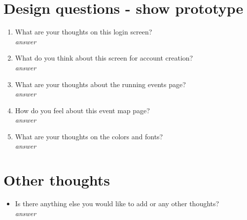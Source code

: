 \documentclass{article}
\begin{document}
\section*{Design questions - show prototype}
\begin{enumerate}[label=\textbf{Question \arabic*:}]
    \item What are your thoughts on this login screen?\\
        \textit{answer}
    \item What do you think about this screen for account creation?\\
        \textit{answer}
    \item What are your thoughts about the running events page?\\
        \textit{answer}
    \item How do you feel about this event map page?\\
        \textit{answer}
    \item What are your thoughts on the colors and fonts?\\
        \textit{answer}
\end{enumerate}

\section*{Other thoughts}
\begin{itemize}[label=]
    \item Is there anything else you would like to add or any other thoughts?\\
    \textit{answer}
\end{itemize}
\thispagestyle{empty}
\end{document}
